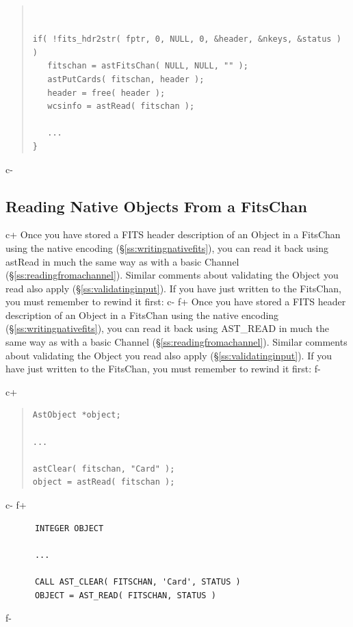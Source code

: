 \documentclass[twoside,11pt]{article}
\newcommand{\secref}[1]{\S\ref{#1}}
\newcommand{\secref}[1]{\ref{#1}}
\begin{document}
\begin{quote}
\small
\begin{verbatim}


if( !fits_hdr2str( fptr, 0, NULL, 0, &header, &nkeys, &status ) )
   fitschan = astFitsChan( NULL, NULL, "" );
   astPutCards( fitschan, header );
   header = free( header );
   wcsinfo = astRead( fitschan );

   ...
}
\end{verbatim}
\normalsize
\end{quote}


c-

\subsection{\label{ss:readingnativefits}Reading Native Objects From a FitsChan}

c+
Once you have stored a FITS header description of an Object in a
FitsChan using the native encoding (\secref{ss:writingnativefits}),
you can read it back using astRead in much the same way as with a
basic Channel (\secref{ss:readingfromachannel}). Similar comments
about validating the Object you read also apply
(\secref{ss:validatinginput}).  If you have just written to the
FitsChan, you must remember to rewind it first:
c-
f+
Once you have stored a FITS header description of an Object in a
FitsChan using the native encoding (\secref{ss:writingnativefits}),
you can read it back using AST\_READ in much the same way as with a
basic Channel (\secref{ss:readingfromachannel}). Similar comments
about validating the Object you read also apply
(\secref{ss:validatinginput}).  If you have just written to the
FitsChan, you must remember to rewind it first:
f-

c+
\begin{quote}
\small
\begin{verbatim}
AstObject *object;

...

astClear( fitschan, "Card" );
object = astRead( fitschan );
\end{verbatim}
\normalsize
\end{quote}
c-
f+
\small
\begin{verbatim}
      INTEGER OBJECT

      ...

      CALL AST_CLEAR( FITSCHAN, 'Card', STATUS )
      OBJECT = AST_READ( FITSCHAN, STATUS )
\end{verbatim}
\normalsize
f-
\end{document}

